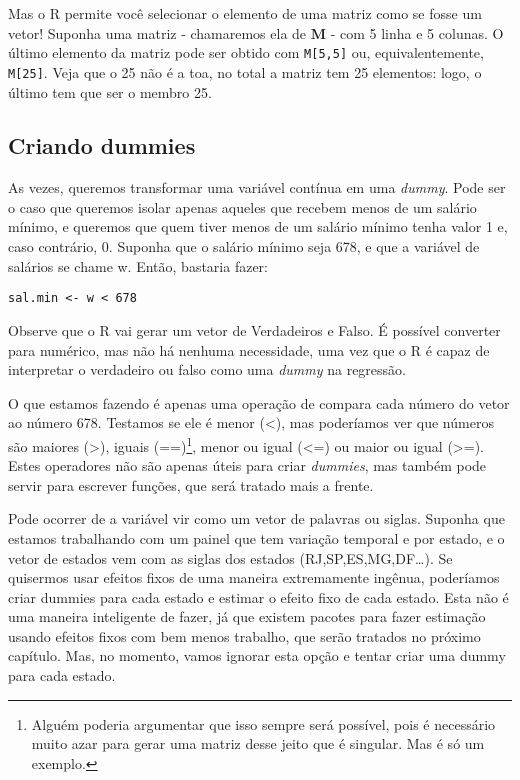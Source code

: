 \documentclass[]{book}
\let\rmarkdownfootnote\footnote%
\def\footnote{\protect\rmarkdownfootnote}
\begin{document}
Mas o R permite você selecionar o elemento de uma matriz como se fosse
um vetor! Suponha uma matriz - chamaremos ela de \(\mathbf{M}\) - com 5
linha e 5 colunas. O último elemento da matriz pode ser obtido com
\texttt{M{[}5,5{]}} ou, equivalentemente, \texttt{M{[}25{]}}. Veja que o
25 não é a toa, no total a matriz tem 25 elementos: logo, o último tem
que ser o membro 25.

\subsection{Criando dummies}

As vezes, queremos transformar uma variável contínua em uma
\emph{dummy}. Pode ser o caso que queremos isolar apenas aqueles que
recebem menos de um salário mínimo, e queremos que quem tiver menos de
um salário mínimo tenha valor 1 e, caso contrário, 0. Suponha que o
salário mínimo seja 678, e que a variável de salários se chame w. Então,
bastaria fazer:

\begin{verbatim}
sal.min <- w < 678
\end{verbatim}

Observe que o R vai gerar um vetor de Verdadeiros e Falso. É possível
converter para numérico, mas não há nenhuma necessidade, uma vez que o R
é capaz de interpretar o verdadeiro ou falso como uma \emph{dummy} na
regressão.

O que estamos fazendo é apenas uma operação de compara cada número do
vetor ao número 678. Testamos se ele é menor (\textless{}), mas
poderíamos ver que números são maiores (\textgreater{}), iguais
(==)\footnote{Alguém poderia argumentar que isso sempre será possível,
  pois é necessário muito azar para gerar uma matriz desse jeito que é
  singular. Mas é só um exemplo.}, menor ou igual (\textless{}=) ou
maior ou igual (\textgreater{}=). Estes operadores não são apenas úteis
para criar \emph{dummies}, mas também pode servir para escrever funções,
que será tratado mais a frente.

Pode ocorrer de a variável vir como um vetor de palavras ou siglas.
Suponha que estamos trabalhando com um painel que tem variação temporal
e por estado, e o vetor de estados vem com as siglas dos estados
(RJ,SP,ES,MG,DF\ldots{}). Se quisermos usar efeitos fixos de uma maneira
extremamente ingênua, poderíamos criar dummies para cada estado e
estimar o efeito fixo de cada estado. Esta não é uma maneira inteligente
de fazer, já que existem pacotes para fazer estimação usando efeitos
fixos com bem menos trabalho, que serão tratados no próximo capítulo.
Mas, no momento, vamos ignorar esta opção e tentar criar uma dummy para
cada estado.
\end{document}
